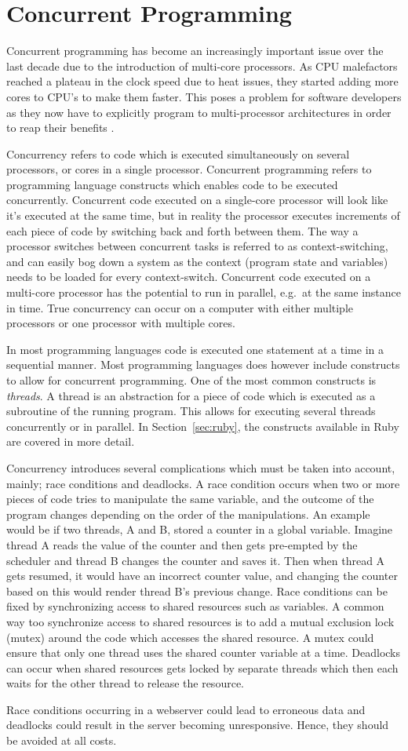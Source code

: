 \section{Concurrent Programming} %
\label{sec:concurrent}
Concurrent programming has become an increasingly important issue over the
last decade due to the introduction of multi-core processors. As CPU
malefactors reached a plateau in the clock speed due to heat issues, they
started adding more cores to CPU's to make them faster. This poses a problem
for software developers as they now have to explicitly program to
multi-processor architectures in order to reap their benefits \cite{fund}.

Concurrency refers to code which is executed simultaneously on several
processors, or cores in a single processor. Concurrent programming refers to
programming language constructs which enables code to be executed concurrently.
Concurrent code executed on a single-core processor will look like it's executed
at the same time, but in reality the processor executes increments of each piece
of code by switching back and forth between them. The way a processor switches
between concurrent tasks is referred to as context-switching, and can easily bog
down a system as the context (program state and variables) needs to be loaded
for every context-switch. Concurrent code executed on a multi-core processor
has the potential to run in parallel, e.g.\ at the same instance in
time. True concurrency can occur on a computer with either multiple processors
or one processor with multiple cores.

In most programming languages code is executed one statement at a time in a
sequential manner. Most programming languages does however include constructs
to allow for concurrent programming.  One of the most common constructs is
\textit{threads}. A thread is an abstraction for a piece of code which is
executed as a subroutine of the running program. This allows for executing
several threads concurrently or in parallel.  In
Section~\ref{sec:ruby}, the constructs available in Ruby are covered in more
detail.

Concurrency introduces several complications which must be taken into account,
mainly; race conditions and deadlocks. A race condition occurs when two or more
pieces of code tries to manipulate the same variable, and the outcome of the
program changes depending on the order of the manipulations. An example would be
if two threads, A and B, stored a counter in a global variable. Imagine thread A 
reads the value of the counter and then gets pre-empted by the scheduler and thread B changes
the counter and saves it. Then when thread A gets resumed, it would have an
incorrect counter value, and changing the counter based on this would render
thread B's previous change. Race conditions can be fixed by synchronizing access
to shared resources such as variables. A common way too synchronize access to
shared resources is to add a mutual exclusion lock (mutex) around the code which
accesses the shared resource. A mutex could ensure that only one thread uses the
shared counter variable at a time. Deadlocks can occur when shared resources gets
locked by separate threads which then each waits for the other thread to
release the resource.

Race conditions occurring in a webserver could lead to erroneous data and
deadlocks could result in the server becoming unresponsive. Hence, they should
be avoided at all costs.
